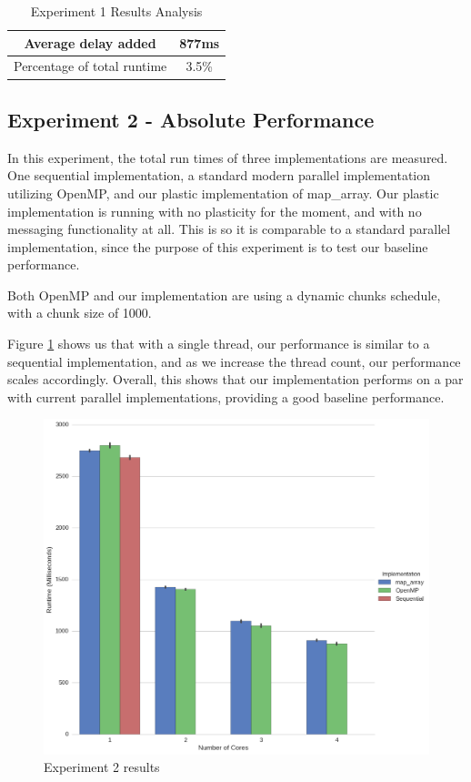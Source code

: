 \begin{table}[H]
\centering
	\begin{tabular}{|c|c|}
		\hline
		Average delay added & 877ms \\
		\hline
		Percentage of total runtime & 3.5\% \\
		\hline
	\end{tabular}
	\caption{Experiment 1 Results Analysis}
	\label{table:results_experiment_1_results_analysis}
\end{table}





\subsection{Experiment 2 - Absolute Performance}

In this experiment, the total run times of three implementations are measured. One sequential implementation, a standard modern parallel implementation utilizing OpenMP, and our plastic implementation of map\_array. Our plastic implementation is running with no plasticity for the moment, and with no messaging functionality at all. This is so it is comparable to a standard parallel implementation, since the purpose of this experiment is to test our baseline performance.

Both OpenMP and our implementation are using a dynamic chunks schedule, with a chunk size of 1000.

Figure \ref{fig:results_ex2} shows us that with a single thread, our performance is similar to a sequential implementation, and as we increase the thread count, our performance scales accordingly. Overall, this shows that our implementation performs on a par with current parallel implementations, providing a good baseline performance. 



\begin{figure}
	\centering
	\includegraphics[width=\textwidth]{graphics/experiment2.png}
	\caption{Experiment 2 results}
	\label{fig:results_ex2}
\end{figure}

